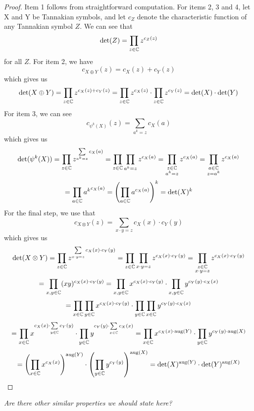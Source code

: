 \begin{proof}
Item 1 follows from straightforward computation. For items 2, 3 and 4, let X and Y be Tannakian symbols, and let $c_Z$ denote the characteristic function of any Tannakian symbol $Z$. We can see that 
$$\det(Z) = \prod_{z \in \mathbb{C}} z^{c_Z(z)}$$
for all $Z$. For item 2, we have 
$$c_{X \oplus Y}(z) = c_X(z) + c_Y(z)$$
which gives us
$$\det(X \oplus Y) = \prod_{z \in \mathbb{C}} z^{c_X(z) + c_Y(z)} = \prod_{z \in \mathbb{C}} z^{c_X(z)} \cdot \prod_{z \in \mathbb{C}} z^{c_Y(z)} = \det(X) \cdot \det(Y)$$
For item 3, we can see
$$c_{\psi^k(X)}(z) = \sum_{a^k = z} c_{X}(a)$$
which gives us
$$\det(\psi^k(X)) = \prod_{z \in \mathbb{C}} z^{\sum\limits_{a^k = z} c_{X}(a)} = \prod_{z \in \mathbb{C}} \prod_{a^k = z} z^{c_{X}(a)} = \prod_{\substack{z \in \mathbb{C} \\ a^k = z}} z^{c_{X}(a)} = \prod_{\substack{a \in \mathbb{C} \\ z = a^k}} z^{c_{X}(a)}$$
$$= \prod_{\substack{a \in \mathbb{C}}} {a^k}^{c_{X}(a)} = \left(\prod_{\substack{a \in \mathbb{C}}} a^{c_{X}(a)}\right)^k = \det(X)^k$$
For the final step, we use that 
$$c_{X \otimes Y}(z) = \sum_{x \cdot y=z} c_X(x) \cdot c_Y(y)$$
which gives us
$$\det(X \otimes Y) = \prod_{z \in \mathbb{C}} z^{\sum\limits_{x \cdot y=z} c_X(x) \cdot c_Y(y)} = \prod_{z \in \mathbb{C}} \prod_{x \cdot y=z} z^{ c_X(x) \cdot c_Y(y)} = \prod_{\substack{z \in \mathbb{C} \\ x \cdot y=z}}  z^{ c_X(x) \cdot c_Y(y)}$$
$$ = \prod_{\substack{x, y \in \mathbb{C}}} (xy)^{ c_X(x) \cdot c_Y(y)} = \prod_{\substack{x, y \in \mathbb{C}}} x^{ c_X(x) \cdot c_Y(y)} \cdot \prod_{\substack{x, y \in \mathbb{C}}} y^{ c_Y(y) \cdot c_X(x) }$$
$$= \prod_{\substack{x \in \mathbb{C}}} \prod_{\substack{y \in \mathbb{C}}}x^{ c_X(x) \cdot c_Y(y)} \cdot \prod_{\substack{y \in \mathbb{C}}} \prod_{\substack{x \in \mathbb{C}}} y^{ c_Y(y) \cdot c_X(x)}$$
$$= \prod_{x \in \mathbb{C}} x^{ c_X(x) \cdot \sum\limits_{y \in \mathbb{C}} c_Y(y)} \cdot \prod_{y \in \mathbb{C}} y^{ c_Y(y) \cdot \sum\limits_{x \in \mathbb{C}} c_X(x)}= \prod_{x \in \mathbb{C}} x^{ c_X(x) \cdot \mathrm{aug}(Y)} \cdot \prod_{y \in \mathbb{C}} y^{ c_Y(y) \cdot \mathrm{aug}(X)}$$
$$= \left(\prod_{x \in \mathbb{C}} x^{ c_X(x)} \right)^{\mathrm{aug}(Y)} \cdot \left(\prod_{y \in \mathbb{C}} y^{ c_Y(y)} \right)^{\mathrm{aug}(X)} = \det(X)^{\mathrm{aug}(Y)} \cdot \det(Y)^{\mathrm{aug}(X)}$$

\end{proof}

\emph{Are there other similar properties we should state here?} %


